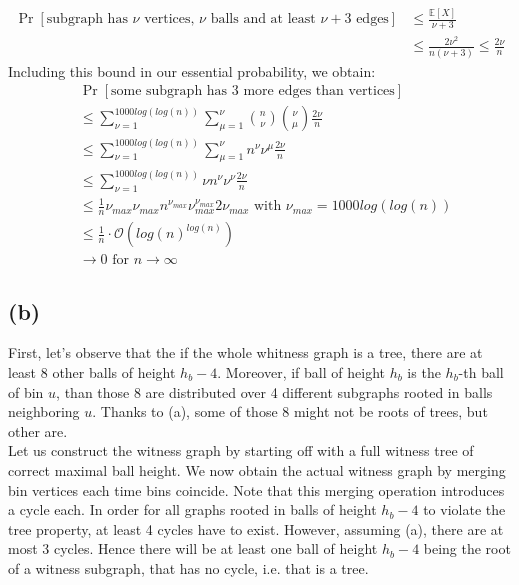 \documentclass[a4paper,german]{article}
\newcommand{\E}{\mathbb{E}}
\begin{document}
	 \begin{align*}
	 	\Pr[\text{subgraph has }  \nu \text{ vertices, } \nu \text{ balls  and at least } \nu + 3 \text{ edges}] &\leq \frac{\E[X]}{\nu +3} \\
	 	&\leq \frac{2 \nu ^2}{n (\nu +3)} \leq \frac{2\nu}{n}
	\end{align*}
	Including this bound in our essential probability, we obtain:
	\begin{align*}
		& \Pr[\text{some subgraph has 3 more edges than vertices}] \\
		&\leq \sum_{\nu = 1}^{1000 log(log(n))} \sum_{\mu = 1}^{\nu} {n \choose \nu} {\nu \choose \mu} \frac{2\nu}{n} \\
		&\leq \sum_{\nu = 1}^{1000 log(log(n))} \sum_{\mu = 1}^{\nu} n^\nu \nu^\mu \frac{2\nu}{n} \\
		&\leq \sum_{\nu = 1}^{1000 log(log(n))} \nu n^\nu \nu^\nu \frac{2\nu}{n} \\
		&\leq \frac{1}{n} \nu_{max} \nu_{max}  n^{\nu_{max}}  \nu_{max} ^{\nu_{max}}  2 \nu_{max} \text{ with } \nu_{max} = 1000 log(log(n)) \\
		&\leq \frac{1}{n} \cdot \mathcal{O} (log(n)^{log(n)}) \\
		& \to 0 \text{ for } n \to \infty
	\end{align*}
\subsection*{(b)}

First, let's observe that the if the whole whitness graph is a tree, there are at least 8 other balls of height \(h_b - 4\). Moreover, if ball of height \(h_b\) is the \(h_b\)-th ball of bin \(u\), than those 8 are distributed over 4 different subgraphs rooted in balls neighboring \(u\). Thanks to (a), some of those 8 might not be roots of trees, but other are.\\
Let us construct the witness graph by starting off with a full witness tree of correct maximal ball height. We now obtain the actual witness graph by merging bin vertices each time bins coincide. Note that this merging operation introduces a cycle each. In order for all graphs rooted in balls of height \(h_b -4\) to violate the tree property, at least 4 cycles have to exist. However, assuming (a), there are at most 3 cycles. Hence there will be at least one ball of height \(h_b-4\) being the root of a witness subgraph, that has no cycle, i.e. that is a tree.
\end{document}
